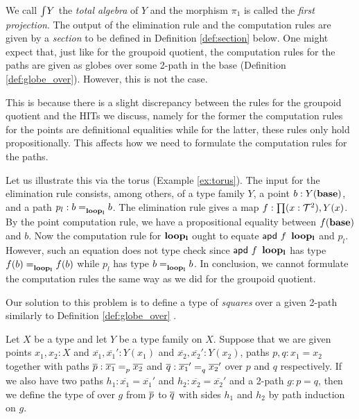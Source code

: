 We call $\TotalAlg{Y}$ the \emph{total algebra} of $Y$ and the morphism $\pi_1$ is called the \emph{first projection}.
The output of the elimination rule and the computation rules are given by a \emph{section} to be defined in Definition \ref{def:section} below.
One might expect that, just like for the groupoid quotient, the computation rules for the paths
are given as globes over some 2-path in the base (Definition \ref{def:globe_over}).
However, this is not the case.

This is because there is a slight discrepancy between the rules for the groupoid quotient and the HITs we discuss,
namely for the former the computation rules for the points are definitional equalities
while for the latter, these rules only hold propositionally.
This affects how we need to formulate the computation rules for the paths.

Let us illustrate this via the torus (Example \ref{ex:torus}).
The input for the elimination rule consists, among others, of a type family $Y$, a point $b : Y(\base)$,
and a path $p_l : \pathover{\leftLoop}{b}{b}$.
The elimination rule gives a map $f : \depprod{(x : \torus)}{Y(x)}$.
By the point computation rule, we have a propositional equality between $f(\base)$ and $b$.
Now the computation rule for $\leftLoop$ ought to equate $\apd{f}{\leftLoop}$ and $p_l$.
However, such an equation does not type check since $\apd{f}{\leftLoop}$ has type $\pathover{\leftLoop}{f(b)}{f(b)}$ while $p_l$ has type $\pathover{\leftLoop}{b}{b}$.
In conclusion, we cannot formulate the computation rules the same way as we did for the groupoid quotient.

Our solution to this problem is to define a type of \emph{squares} over a given 2-path similarly to Definition \ref{def:globe_over} \cite{licata2015cubical}.

\begin{definition}
Let $X$ be a type and let $Y$ be a type family on $X$.
Suppose that we are given points $x_1, x_2 : X$ and $\overline{x_1}, \overline{x_1}' : Y(x_1)$ and $\overline{x_2}, \overline{x_2}' : Y(x_2)$, paths $p, q : x_1 = x_2$ together with paths $\pover{p} : \pathover{p}{\overline{x_1}}{\overline{x_2}}$ and $\pover{q} : \pathover{q}{\overline{x_1}'}{\overline{x_2}'}$ over $p$ and $q$ respectively.
If we also have two paths $h_1 : \overline{x_1} = \overline{x_1}'$ and $h_2 : \overline{x_2} = \overline{x_2}'$ and a 2-path $g : p = q$,
then we define the type of  over $g$ from $\pover{p}$ to $\pover{q}$ with sides $h_1$ and $h_2$ by path induction on $g$.
\end{definition}

